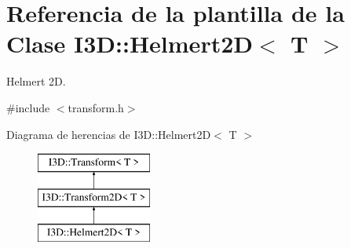 \hypertarget{class_i3_d_1_1_helmert2_d}{}\section{Referencia de la plantilla de la Clase I3D\+:\+:Helmert2D$<$ T $>$}
\label{class_i3_d_1_1_helmert2_d}


Helmert 2D.  




{\ttfamily \#include $<$transform.\+h$>$}

Diagrama de herencias de I3D\+:\+:Helmert2D$<$ T $>$\begin{figure}[H]
\begin{center}
\leavevmode
\includegraphics[height=3.000000cm]{class_i3_d_1_1_helmert2_d}
\end{center}
\end{figure}
